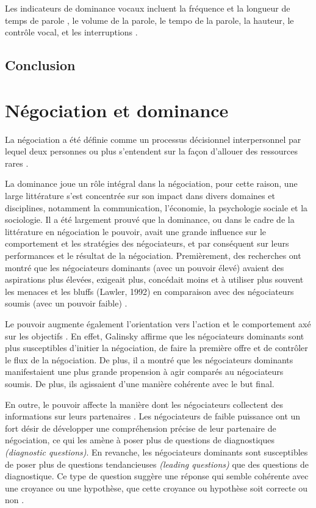 			Les indicateurs de dominance vocaux incluent la fréquence et la longueur de temps de parole \cite{mast2002dominance}, le volume de la parole, le tempo de la parole, la hauteur, le contrôle vocal, et les interruptions \cite{dunbar2005perceptions}.
		
		\subsection{Conclusion}

\section{Négociation et dominance}
	La négociation a été définie comme un processus décisionnel interpersonnel par lequel deux personnes ou plus s'entendent sur la façon d'allouer des ressources rares \cite{thompson2000mind}. 
	
	La dominance joue un rôle intégral dans la négociation, pour cette raison, une large littérature s'est concentrée sur son impact dans divers domaines et disciplines, notamment la communication, l'économie, la psychologie sociale et la sociologie. Il a été largement prouvé que la dominance, ou dans le cadre de la littérature en négociation le pouvoir, avait une grande influence sur le comportement et les stratégies des négociateurs, et par conséquent sur leurs performances et le résultat de la négociation.
	Premièrement, des recherches ont montré que les négociateurs dominants (avec un pouvoir élevé) avaient des aspirations plus élevées, exigeait plus, concédait moins et à utiliser plus souvent les menaces et les bluffs (Lawler, 1992) en comparaison avec des négociateurs soumis (avec un pouvoir faible) \cite{de1995impact}.
	
	
	 Le pouvoir augmente également l'orientation vers l'action et le comportement axé sur les objectifs \cite{van2006power}. En effet, Galinsky \cite{galinsky2003power} affirme que les négociateurs dominants sont plus susceptibles d'initier la négociation, de faire la première offre et de contrôler le flux de la négociation.  De plus, il a montré que les négociateurs dominants manifestaient une plus grande propension à agir comparés au négociateurs soumis. De plus, ils agissaient d'une manière cohérente avec le but final.
	 
	 
	 En outre, le pouvoir affecte la manière dont les négociateurs collectent des informations sur leurs partenaires \cite{de2004influence}. Les négociateurs de faible puissance ont un fort désir de développer une compréhension précise de leur partenaire de négociation, ce qui les amène à poser plus de questions  de diagnostiques \emph {(diagnostic questions)}.
	 En revanche, les négociateurs dominants sont susceptibles de poser plus de questions tendancieuses \emph {(leading questions)} que des questions de diagnostique. Ce type de question suggère une réponse  qui semble cohérente avec une croyance ou une hypothèse, que cette croyance ou hypothèse soit correcte ou non \cite{galinsky2003power}.
	
